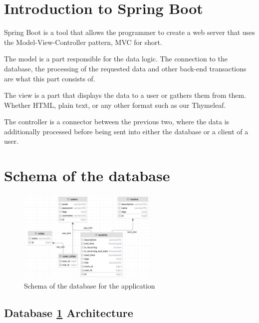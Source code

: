 \section{Introduction to Spring Boot}\label{sec:introduction-to-spring-boot}

Spring Boot is a tool that allows the programmer to create a web server that uses the Model-View-Controller pattern, MVC for short.

The model is a part responsible for the data logic.
The connection to the database, the processing of the requested data and other back-end transactions are what this part consists of.

The view is a part that displays the data to a user or gathers them from them.
Whether HTML, plain text, or any other format such as our Thymeleaf.

The controller is a connector between the previous two, where the data is additionally processed before being sent into either the database or a client of a user.


\section{Schema of the database}\label{sec:schema-of-the-database}
\begin{figure}[h]
  \centering
  \includegraphics[width=0.6\textwidth]{schemaDB}
  \caption{Schema of the database for the application}
  \label{fig:schemaDB}
\end{figure}

\subsection*{Database \ref{fig:schemaDB} Architecture}

